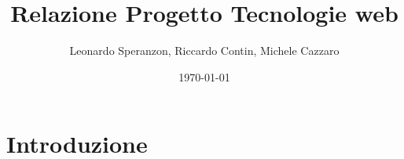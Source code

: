 \documentclass{article}
\title{Relazione Progetto Tecnologie web}
\author{Leonardo Speranzon, Riccardo Contin, Michele Cazzaro}
\date{\today}
\begin{document}
    \maketitle
    
    \section{Introduzione}
\end{document}
